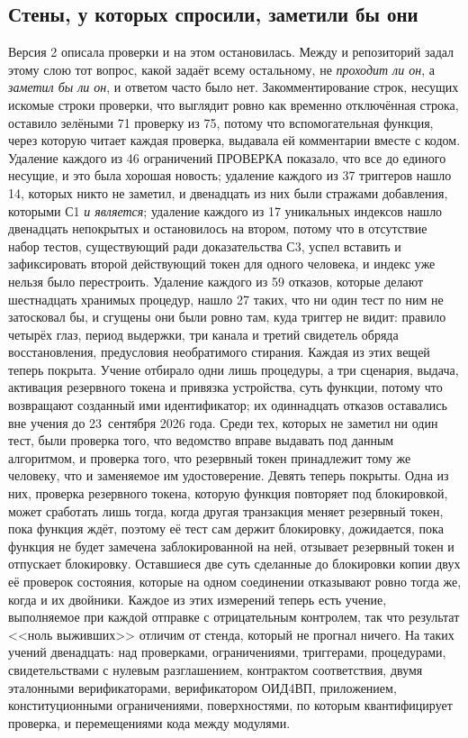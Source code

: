 \subsection*{Стены, у которых спросили, заметили бы они}

Версия 2 описала проверки и на этом остановилась. Между  и  репозиторий
задал этому слою тот вопрос, какой задаёт всему остальному, не \emph{проходит ли он}, а
\emph{заметил бы ли он}, и ответом часто было нет. Закомментирование строк, несущих искомые строки
проверки, что выглядит ровно как временно отключённая строка, оставило зелёными 71 проверку из
75, потому что вспомогательная функция, через которую читает каждая проверка, выдавала ей
комментарии вместе с кодом. Удаление каждого из 46 ограничений ПРОВЕРКА показало, что все до единого
несущие, и это была хорошая новость; удаление каждого из 37 триггеров нашло 14, которых никто не
заметил, и двенадцать из них были стражами добавления, которыми С1 \emph{и является}; удаление
каждого из 17 уникальных индексов нашло двенадцать непокрытых и остановилось на втором, потому что
в отсутствие  набор тестов, существующий ради доказательства
С3, успел вставить и зафиксировать второй действующий токен для одного человека, и индекс уже
нельзя было перестроить. Удаление каждого из 59 отказов, которые делают шестнадцать хранимых
процедур, нашло 27 таких, что ни один тест по ним не затосковал бы, и сгущены они были ровно там,
куда триггер не видит: правило четырёх глаз, период выдержки, три канала и третий свидетель обряда
восстановления, предусловия необратимого стирания. Каждая из этих вещей теперь покрыта. Учение
отбирало одни лишь процедуры, а три сценария, выдача, активация резервного токена и привязка
устройства, суть функции, потому что возвращают созданный ими идентификатор; их одиннадцать отказов
оставались вне учения до 23~сентября 2026 года. Среди тех, которых не заметил ни один тест,
были проверка того, что ведомство вправе выдавать под данным алгоритмом, и проверка того, что резервный токен
принадлежит тому же человеку, что и заменяемое им удостоверение. Девять теперь покрыты. Одна из них, проверка резервного токена, которую функция повторяет под
блокировкой, может сработать лишь тогда, когда другая транзакция меняет резервный токен, пока
функция ждёт, поэтому её тест сам держит блокировку, дожидается, пока функция не будет замечена
заблокированной на ней, отзывает резервный токен и отпускает блокировку. Оставшиеся две суть сделанные до блокировки копии
двух её проверок состояния, которые на одном соединении отказывают ровно тогда же,
когда и их двойники. Каждое из этих измерений теперь есть учение, выполняемое при каждой отправке с отрицательным контролем,
так что результат <<ноль выживших>> отличим от стенда, который не прогнал ничего. На
 таких учений двенадцать: над проверками, ограничениями, триггерами, процедурами,
свидетельствами с нулевым разглашением, контрактом соответствия, двумя эталонными верификаторами,
верификатором ОИД4ВП, приложением, конституционными ограничениями, поверхностями, по которым
квантифицирует проверка, и перемещениями кода между модулями.

